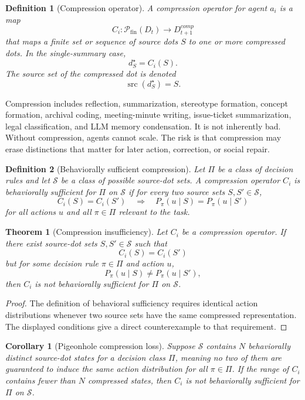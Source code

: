 \documentclass[11pt]{article}
\newtheorem{definition}{Definition}
\newtheorem{theorem}{Theorem}
\newtheorem{corollary}{Corollary}
\theoremstyle{remark}
\begin{document}
\begin{definition}[Compression operator]\label{def:compression-operator}
A compression operator for agent $a_i$ is a map
$$
C_i:\mathcal P_{\mathrm{fin}}(D_t)\to D_{t+1}^{comp}
$$
that maps a finite set or sequence of source dots $S$ to one or more
compressed dots. In the single-summary case,
$$
d_S^\star=C_i(S).
$$
The source set of the compressed dot is denoted
$$
\operatorname{src}(d_S^\star)=S.
$$
\end{definition}

Compression includes reflection, summarization, stereotype formation,
concept formation, archival coding, meeting-minute writing, issue-ticket
summarization, legal classification, and LLM memory condensation. It is
not inherently bad. Without compression, agents cannot scale. The risk
is that compression may erase distinctions that matter for later action,
correction, or social repair.

\begin{definition}[Behaviorally sufficient compression]\label{def:behaviorally-sufficient-compression}
Let $\Pi$ be a class of decision rules and let $\mathcal S$ be a class
of possible source-dot sets. A compression operator $C_i$ is
behaviorally sufficient for $\Pi$ on $\mathcal S$ if for every two
source sets $S,S'\in\mathcal S$,
$$
C_i(S)=C_i(S')
\quad\Rightarrow\quad
P_{\pi}(u\mid S)=P_{\pi}(u\mid S')
$$
for all actions $u$ and all $\pi\in\Pi$ relevant to the task.
\end{definition}

\begin{theorem}[Compression insufficiency]\label{thm:compression-insufficiency}
Let $C_i$ be a compression operator. If there exist source-dot sets
$S,S'\in\mathcal S$ such that
$$
C_i(S)=C_i(S')
$$
but for some decision rule $\pi\in\Pi$ and action $u$,
$$
P_{\pi}(u\mid S)\neq P_{\pi}(u\mid S'),
$$
then $C_i$ is not behaviorally sufficient for $\Pi$ on $\mathcal S$.
\end{theorem}

\begin{proof}
The definition of behavioral sufficiency requires identical action
distributions whenever two source sets have the same compressed
representation. The displayed conditions give a direct counterexample to
that requirement.
\end{proof}

\begin{corollary}[Pigeonhole compression loss]\label{cor:pigeonhole-compression-loss}
Suppose $\mathcal S$ contains $N$ behaviorally distinct source-dot
states for a decision class $\Pi$, meaning no two of them are guaranteed
to induce the same action distribution for all $\pi\in\Pi$. If the
range of $C_i$ contains fewer than $N$ compressed states, then $C_i$ is
not behaviorally sufficient for $\Pi$ on $\mathcal S$.
\end{corollary}
\end{document}
